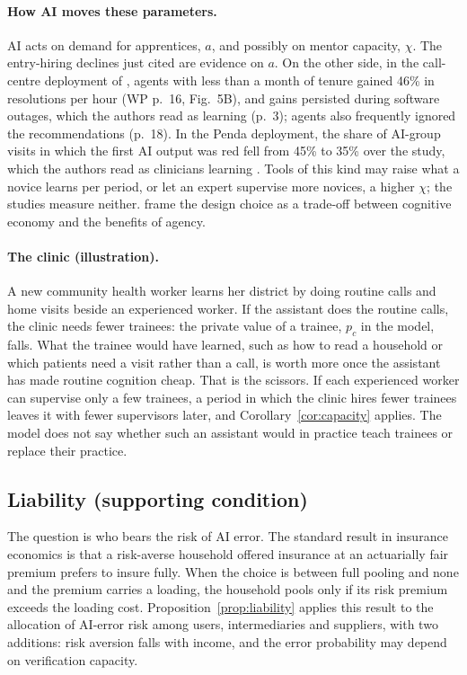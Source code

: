 \documentclass[12pt]{article}
\theoremstyle{remark}
\begin{document}
\paragraph{How AI moves these parameters.} AI acts on demand for apprentices, $a$, and possibly on mentor capacity, $\chi$. The entry-hiring declines just cited are evidence on $a$. On the other side, in the call-centre deployment of \citet{brynjolfsson2025work}, agents with less than a month of tenure gained 46\% in resolutions per hour (WP p.~16, Fig.~5B), and gains persisted during software outages, which the authors read as learning (p.~3); agents also frequently ignored the recommendations (p.~18). In the Penda deployment, the share of AI-group visits in which the first AI output was red fell from 45\% to 35\% over the study, which the authors read as clinicians learning \citep[p.~18]{korom2025penda}. Tools of this kind may raise what a novice learns per period, or let an expert supervise more novices, a higher $\chi$; the studies measure neither. \citet[p.~277, fn.~6]{ludwig2026reflective} frame the design choice as a trade-off between cognitive economy and the benefits of agency.

\paragraph{The clinic (illustration).} A new community health worker learns her district by doing routine calls and home visits beside an experienced worker. If the assistant does the routine calls, the clinic needs fewer trainees: the private value of a trainee, $p_c$ in the model, falls. What the trainee would have learned, such as how to read a household or which patients need a visit rather than a call, is worth more once the assistant has made routine cognition cheap. That is the scissors. If each experienced worker can supervise only a few trainees, a period in which the clinic hires fewer trainees leaves it with fewer supervisors later, and Corollary~\ref{cor:capacity} applies. The model does not say whether such an assistant would in practice teach trainees or replace their practice.

\subsection{Liability (supporting condition)}\label{sec:liability}

The question is who bears the risk of AI error. The standard result in insurance economics is that a risk-averse household offered insurance at an actuarially fair premium prefers to insure fully. When the choice is between full pooling and none and the premium carries a loading, the household pools only if its risk premium exceeds the loading cost. Proposition~\ref{prop:liability} applies this result to the allocation of AI-error risk among users, intermediaries and suppliers, with two additions: risk aversion falls with income, and the error probability may depend on verification capacity.
\end{document}
